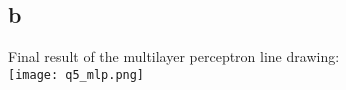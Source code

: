 \documentclass[11pt, oneside]{article}   	%
\begin{document}
\begin{flushleft}
\subsection*{b}
Final result of the multilayer perceptron line drawing: \\
\texttt{[image: q5\_mlp.png]}

\end{flushleft}
\end{document}
